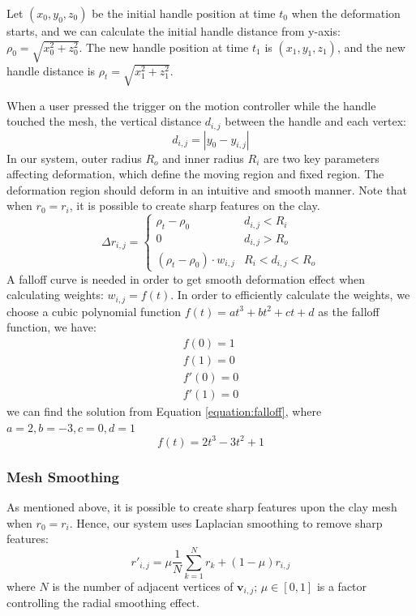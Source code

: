 \documentclass{svjour3}                     %
\begin{document}
Let $(x_{0},y_{0},z_{0})$ be the initial handle position at time $t_{0}$ when the deformation starts, and we can calculate the initial handle distance from y-axis: $\rho_{0} = \sqrt{x_{0}^2 + z_{0}^2}$. The new handle position at time $t_{1}$ is $(x_{1},y_{1},z_{1})$, and the new handle distance is $\rho_{t} = \sqrt{x_{1}^2 + z_{1}^2}$.

When a user pressed the trigger on the motion controller while the handle touched the mesh, the vertical distance $d_{i,j}$ between the handle and each vertex:
\begin{equation}
d_{i,j} = |y_{0} - y_{i,j}|
\end{equation}
In our system, outer radius $R_{o}$ and inner radius $R_{i}$ are two key parameters affecting deformation, which define the moving region and fixed region. The deformation region should deform in an intuitive and smooth manner. Note that when $r_{0} = r_{i}$, it is possible to create sharp features on the clay.
\begin{equation}
\Delta r_{i,j} = \begin{cases}
\rho_{t} - \rho_{0} &  d_{i,j} < R_{i} \\
0 &  d_{i,j} > R_{o} \\
(\rho_{t} - \rho_{0}) \cdot w_{i,j} &  R_{i} < d_{i,j} < R_{o}
\end{cases}
\end{equation}
A falloff curve is needed in order to get smooth deformation effect when calculating weights: $w_{i,j} = f(t)$. In order to efficiently calculate the weights, we choose a cubic polynomial function $f(t) = at^3 + bt^2 + ct + d$ as the falloff function, we have:
\begin{equation}
\begin{aligned}
\label{equation:falloff}
f(0) = 1 \\
f(1) = 0 \\ 
f'(0) = 0 \\
f'(1) = 0
\end{aligned}
\end{equation}
we can find the solution from Equation \ref{equation:falloff}, where 
$a = 2, b = -3, c = 0, d = 1$
\begin{equation}
f(t) = 2t^3 - 3t^2 + 1
\end{equation}

\subsubsection{Mesh Smoothing}
\label{sec:4.2.4}
As mentioned above, it is possible to create sharp features upon the clay mesh when $r_{0} = r_{i}$. Hence, our system uses Laplacian smoothing to remove sharp features: 
\begin{equation}
r'_{i,j} = 
\mu  \frac{1}{N} 
\sum_{k=1}^N r_{k}
+ (1 - \mu)  r_{i,j}
\end{equation}
where $N$ is the number of adjacent vertices of $\mathbf{v}_{i,j}$; $\mu \in [0,1]$ is a factor controlling the radial smoothing effect.
\end{document}
